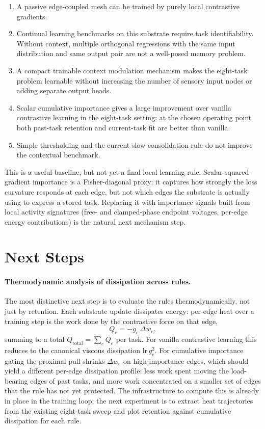 \documentclass[11pt]{article}
\begin{document}
\begin{enumerate}
\item A passive edge-coupled mesh can be trained by purely local
contrastive gradients.
\item Continual learning benchmarks on this substrate require task
identifiability. Without context, multiple orthogonal regressions with the
same input distribution and same output pair are not a well-posed
memory problem.
\item A compact trainable context modulation mechanism makes the
eight-task problem learnable without increasing the number of sensory
input nodes or adding separate output heads.
\item Scalar cumulative importance gives a large improvement over
vanilla contrastive learning in the eight-task setting: at the chosen
operating point both past-task retention and current-task fit are better
than vanilla.
\item Simple thresholding and the current slow-consolidation rule do not
improve the contextual benchmark.
\end{enumerate}

This is a useful baseline, but not yet a final local learning rule.
Scalar squared-gradient importance is a Fisher-diagonal proxy: it
captures how strongly the loss curvature responds at each edge, but
not which edges the substrate is actually using to express a stored
task. Replacing it with importance signals built from local activity
signatures (free- and clamped-phase endpoint voltages, per-edge energy
contributions) is the natural next mechanism step.

\section{Next Steps}

\paragraph{Thermodynamic analysis of dissipation across rules.}
The most distinctive next step is to evaluate the rules
thermodynamically, not just by retention. Each substrate update
dissipates energy: per-edge heat over a training step is the work done
by the contrastive force on that edge,
\[
Q_e = -g_e\,\Delta w_e,
\]
summing to a total $Q_{\text{total}} = \sum_e Q_e$ per task. For
vanilla contrastive learning this reduces to the canonical viscous
dissipation $\mathrm{lr}\,g_e^2$. For cumulative importance gating the
proximal pull shrinks $\Delta w_e$ on high-importance edges, which
should yield a different per-edge dissipation profile: less work spent
moving the load-bearing edges of past tasks, and more work concentrated
on a smaller set of edges that the rule has not yet protected. The
infrastructure to compute this is already in place in the training
loop; the next experiment is to extract heat trajectories from the
existing eight-task sweep and plot retention against cumulative
dissipation for each rule.
\end{document}
